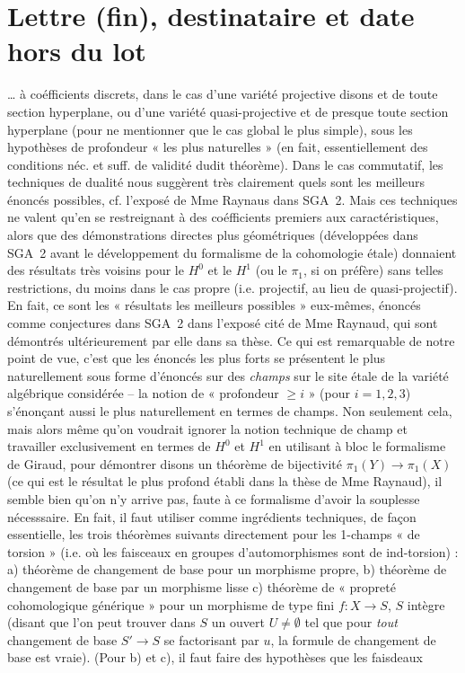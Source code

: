 \documentclass[11pt,a4paper]{article}
\begin{document}
\section{Lettre (fin), destinataire et date hors du lot}

… à coéfficients discrets, dans le cas d'une variété projective disons et de toute section hyperplane, ou d'une variété quasi-projective et de presque toute section hyperplane (pour ne mentionner que le cas global le plus simple), sous les hypothèses de profondeur  « les plus naturelles » (en fait, essentiellement des conditions néc. et suff. de validité dudit théorème). Dans le cas commutatif, les techniques de dualité nous suggèrent très clairement quels sont les meilleurs énoncés possibles, cf. l'exposé de Mme Raynaus dans SGA~2. Mais ces techniques ne valent qu'en se restreignant à des coéfficients premiers aux caractéristiques, alors que des démonstrations directes plus géométriques (développées dans SGA~2 avant le développement du formalisme de la cohomologie étale) donnaient des résultats très voisins pour le $H^0$ et le $H^1$ (ou le  $\pi_1$, si on préfère) sans telles restrictions, du moins dans le cas propre (i.e. projectif, au lieu de quasi-projectif). En fait, ce sont  les « résultats les meilleurs possibles » eux-mêmes, énoncés comme conjectures dans SGA~2 dans l'exposé cité de Mme Raynaud, qui sont démontrés ultérieurement par elle dans sa thèse. Ce qui est remarquable de notre point de vue, c'est que les énoncés les plus forts se présentent le plus naturellement sous forme d'énoncés sur des \emph{champs} sur le site étale de la variété algébrique considérée -- la notion de « profondeur $\geqslant i$ » (pour $i = 1, 2, 3$) s'énonçant aussi le plus naturellement en termes de champs. Non seulement cela, mais alors même qu'on voudrait ignorer la notion technique de champ et travailler exclusivement en termes de $H^0$ et $H^1$ en utilisant à bloc le formalisme  de Giraud, pour démontrer disons un théorème de bijectivité $\pi_1(Y) \to \pi_1(X)$ (ce qui est le résultat le plus profond établi dans la thèse de Mme Raynaud), il semble bien qu'on n'y arrive pas, faute à ce formalisme d'avoir la souplesse nécesssaire. En fait, il faut utiliser comme ingrédients techniques, de façon essentielle, les trois théorèmes suivants directement pour les 1-champs « de torsion » (i.e. où les faisceaux en groupes d'automorphismes sont de ind-torsion) : a) théorème de changement de base pour un morphisme propre, b) théorème de changement de base par un morphisme lisse c) théorème de  « propreté cohomologique générique » pour un morphisme de type fini $f\colon X \to S$, $S$ intègre (disant que l'on peut trouver dans $S$ un ouvert $U \neq \emptyset$ tel que pour \emph{tout} changement de base $S' \to S$ se factorisant par $u$, la formule de changement de base est vraie). (Pour b) et c), il faut faire des hypothèses que les faisdeaux 
\end{document}
